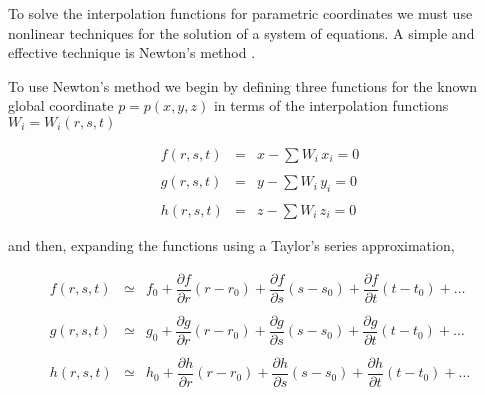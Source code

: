 To solve the interpolation functions for parametric coordinates we must use nonlinear techniques for the solution of a system of equations. A simple and effective technique is Newton’s method \cite{Conte72}.

To use Newton’s method we begin by defining three functions for the known global coordinate $p = p(x,y,z)$ in terms of the interpolation functions $W_i = W_i(r,s,t)$

\begin{equation}\label{eq:8.10}
\begin{array}{lll}
f(r, s, t) &=& x - \sum W_i \, x_i = 0 \\ \\
g(r, s, t) &=& y - \sum W_i \, y_i = 0 \\ \\
h(r, s, t) &=& z - \sum W_i \, z_i = 0
\end{array}
\end{equation}

and then, expanding the functions using a Taylor’s series approximation,

\begin{equation}\label{eq:8.11}
\begin{array}{lll}
f(r, s, t) &\simeq& f_0
  + \dfrac{\partial f}{\partial r}(r - r_0)
  + \dfrac{\partial f}{\partial s}(s - s_0)
  + \dfrac{\partial f}{\partial t}(t - t_0) + \ldots \\ \\
g(r, s, t) &\simeq& g_0
  + \dfrac{\partial g}{\partial r}(r - r_0)
  + \dfrac{\partial g}{\partial s}(s - s_0)
  + \dfrac{\partial g}{\partial t}(t - t_0) + \ldots \\ \\
h(r, s, t) &\simeq& h_0
  + \dfrac{\partial h}{\partial r}(r - r_0)
  + \dfrac{\partial h}{\partial s}(s - s_0)
  + \dfrac{\partial h}{\partial t}(t - t_0) + \ldots
\end{array}
\end{equation}

